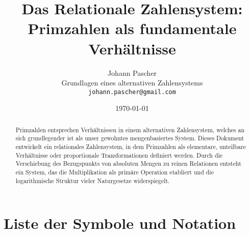 \documentclass[11pt,a4paper]{article}
\title{Das Relationale Zahlensystem:\\
	Primzahlen als fundamentale Verhältnisse}
\author{Johann Pascher\\
	Grundlagen eines alternativen Zahlensystems\\
	\texttt{johann.pascher@gmail.com}}
\date{\today}
\begin{document}
	
	\maketitle
	
	\begin{abstract}
		Primzahlen entsprechen Verhältnissen in einem alternativen Zahlensystem, welches an sich grundlegender ist als unser gewohntes mengenbasiertes System. Dieses Dokument entwickelt ein relationales Zahlensystem, in dem Primzahlen als elementare, unteilbare Verhältnisse oder proportionale Transformationen definiert werden. Durch die Verschiebung des Bezugspunkts von absoluten Mengen zu reinen Relationen entsteht ein System, das die Multiplikation als primäre Operation etabliert und die logarithmische Struktur vieler Naturgesetze widerspiegelt.
	\end{abstract}
	
	\tableofcontents
	\newpage
	
	\section{Liste der Symbole und Notation}
	
\end{document}
